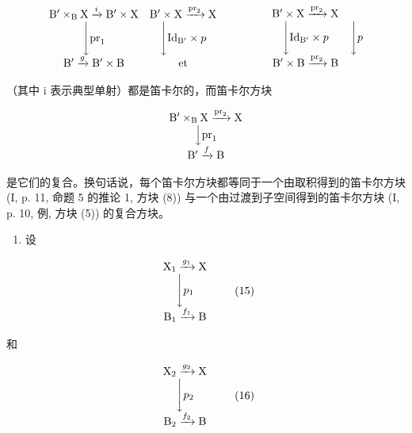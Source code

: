 \[
\begin{array}{c c} \mathrm {B^ {\prime}} \times_ {\mathrm{B}} \mathrm{X} \xrightarrow {i} \mathrm {B^ {\prime}} \times \mathrm{X} & \mathrm {B^ {\prime}} \times \mathrm{X} \xrightarrow {\mathrm{pr} _ {2}} \mathrm{X} \\ \Biggl \downarrow \mathrm{pr} _ {1} & \Biggl \downarrow \mathrm{Id} _ {\mathrm {B^ {\prime}}} \times p \\ \mathrm {B^ {\prime}} \xrightarrow {g} \mathrm {B^ {\prime}} \times \mathrm{B} & \text {et} \end{array} \qquad \qquad \begin{array}{c c} \mathrm {B ^ {\prime}} \times \mathrm{X} \xrightarrow {\mathrm{pr} _ {2}} \mathrm{X} \\ \Biggl \downarrow \mathrm{Id} _ {\mathrm {B^ {\prime}}} \times p & \Biggl \downarrow p \\ \mathrm {B^ {\prime}} \times \mathrm{B} \xrightarrow {\mathrm{pr} _ {2}} \mathrm{B} & \end{array}
\]

（其中 i 表示典型单射）都是笛卡尔的，而笛卡尔方块

\[
\begin{array}{c} \mathrm{B} ^ {\prime} \times_ {\mathrm{B}} \mathrm{X} \xrightarrow {\mathrm{pr} _ {2}} \mathrm{X} \\ \Big \downarrow \mathrm{pr} _ {1} \\ \mathrm{B} ^ {\prime} \xrightarrow {f} \mathrm{B} \end{array}
\]

是它们的复合。换句话说，每个笛卡尔方块都等同于一个由取积得到的笛卡尔方块 (I, p. 11, 命题 5 的推论 1, 方块 (8)) 与一个由过渡到子空间得到的笛卡尔方块 (I, p. 10, 例, 方块 (5)) 的复合方块。

\begin{enumerate}
\def\labelenumi{\arabic{enumi})}
\setcounter{enumi}{2}
\tightlist
\item
  设
\end{enumerate}

\[
\begin{array}{c} \mathrm{X} _ {1} \xrightarrow {g _ {1}} \mathrm{X} \\ \Biggl \downarrow p _ {1} \\ \mathrm{B} _ {1} \xrightarrow {f _ {1}} \mathrm{B} \end{array}\tag{15}
\]

和

\[
\begin{array}{c} \mathrm{X} _ {2} \xrightarrow {g _ {2}} \mathrm{X} \\ \Biggl \downarrow p _ {2} \\ \mathrm{B} _ {2} \xrightarrow {f _ {2}} \mathrm{B} \end{array}\tag{16}
\]

